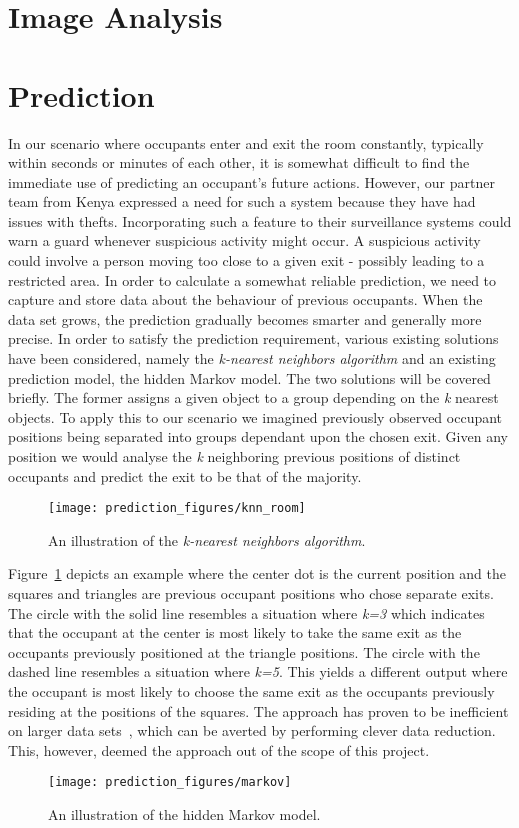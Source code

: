 \section{Image Analysis}
\label{sec:analysis_img}


\section{Prediction}
\label{sec:analysis_pred}
In our scenario where occupants enter and exit the room constantly, typically within seconds or minutes of each other, it is somewhat difficult to find the immediate use of predicting an occupant's future actions. However, our partner team from Kenya expressed a need for such a system because they have had issues with thefts. Incorporating such a feature to their surveillance systems could warn a guard whenever suspicious activity might occur. A suspicious activity could involve a person moving too close to a given exit - possibly leading to a restricted area. In order to calculate a somewhat reliable prediction, we need to capture and store data about the behaviour of previous occupants. When the data set grows, the prediction gradually becomes smarter and generally more precise. In order to satisfy the prediction requirement, various existing solutions have been considered, namely the \emph{k-nearest neighbors algorithm} and an existing prediction model, the hidden Markov model. The two solutions will be covered briefly. The former assigns a given object to a group depending on the \emph{k} nearest objects. To apply this to our scenario we imagined previously observed occupant positions being separated into groups dependant upon the chosen exit. Given any position we would analyse the \emph{k} neighboring previous positions of distinct occupants and predict the exit to be that of the majority.
\begin{figure}
\centering
\texttt{[image: prediction\_figures/knn\_room]}
\caption{An illustration of the \emph{k-nearest neighbors algorithm}.}
\label{fig:knn}
\end{figure}
Figure~\ref{fig:knn} depicts an example where the center dot is the current position and the squares and triangles are previous occupant positions who chose separate exits. The circle with the solid line resembles a situation where \emph{k=3} which indicates that the occupant at the center is most likely to take the same exit as the occupants previously positioned at the triangle positions. The circle with the dashed line resembles a situation where \emph{k=5}. This yields a different output where the occupant is most likely to choose the same exit as the occupants previously residing at the positions of the squares. The approach has proven to be inefficient on larger data sets~\cite{bhatia}, which can be averted by performing clever data reduction. This, however, deemed the approach out of the scope of this project.
\begin{figure}
\centering
\texttt{[image: prediction\_figures/markov]}
\caption{An illustration of the hidden Markov model.}
\label{fig:markov}
\end{figure}

